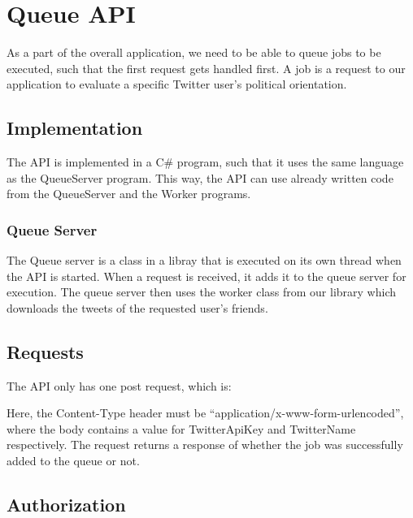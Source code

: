 \chapter{Queue \ac{API}}
As a part of the overall application, we need to be able to queue jobs to be
executed, such that the first request gets handled first. A job is a request to
our application to evaluate a specific Twitter user's political orientation.

\section{Implementation}
The \ac{API} is implemented in a C\# program, such that it uses the same
language as the QueueServer program. This way, the \ac{API} can use already
written code from the QueueServer and the Worker programs.

\subsection{Queue Server}
The Queue server is a class in a libray that is executed on its own thread when
the \ac{API} is started. When a request is received, it adds it to the queue
server for execution. The queue server then uses the worker class from our library which
downloads the tweets of the requested user's friends. 


\section{Requests}
The \ac{API} only has one post request, which is: \nl

\nl

Here, the Content-Type header must be ``application/x-www-form-urlencoded'',
where the body contains a value for TwitterApiKey and TwitterName
respectively.
The request returns a response of whether the job was successfully added to the
queue or not.

\section{Authorization}



